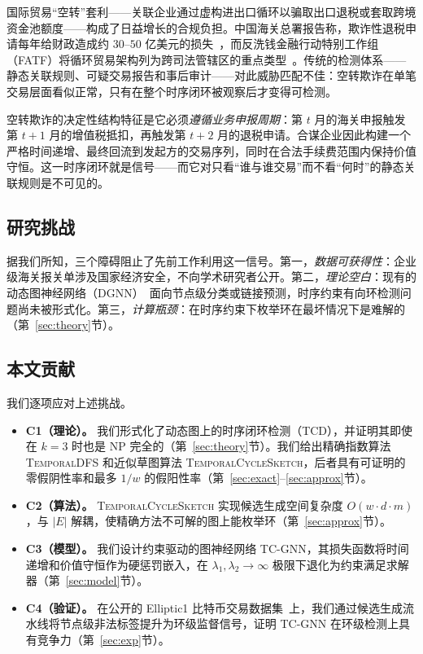 \documentclass[journal,onecolumn]{IEEEtran}
\begin{document}
国际贸易``空转''套利——关联企业通过虚构进出口循环以骗取出口退税或套取跨境资金池额度——构成了日益增长的合规负担。中国海关总署报告称，欺诈性退税申请每年给财政造成约 $30$--$50$ 亿美元的损失~\cite{gaCustoms2023}，而反洗钱金融行动特别工作组（FATF）将循环贸易架构列为跨司法管辖区的重点类型~\cite{fatfTypologies2022}。传统的检测体系——静态关联规则、可疑交易报告和事后审计——对此威胁匹配不佳：空转欺诈在单笔交易层面看似正常，只有在整个时序闭环被观察后才变得可检测。

空转欺诈的决定性结构特征是它必须\emph{遵循业务申报周期}：第 $t$ 月的海关申报触发第 $t+1$ 月的增值税抵扣，再触发第 $t+2$ 月的退税申请。合谋企业因此构建一个严格时间递增、最终回流到发起方的交易序列，同时在合法手续费范围内保持价值守恒。这一时序闭环就是信号——而它对只看``谁与谁交易''而不看``何时''的静态关联规则是不可见的。

\subsection{研究挑战}
\label{sec:intro-challenges}

据我们所知，三个障碍阻止了先前工作利用这一信号。第一，\emph{数据可获得性}：企业级海关报关单涉及国家经济安全，不向学术研究者公开。第二，\emph{理论空白}：现有的动态图神经网络（DGNN）~\cite{tgn2020,dcrnn2018,evolvegcn2020}面向节点级分类或链接预测，时序约束有向环检测问题尚未被形式化。第三，\emph{计算瓶颈}：在时序约束下枚举环在最坏情况下是难解的（第~\ref{sec:theory}节）。

\subsection{本文贡献}
\label{sec:intro-contrib}

我们逐项应对上述挑战。
\begin{itemize}
\item \textbf{C1（理论）。} 我们形式化了动态图上的时序闭环检测（TCD），并证明其即使在 $k=3$ 时也是 NP 完全的（第~\ref{sec:theory}节）。我们给出精确指数算法 \textsc{TemporalDFS} 和近似草图算法 \textsc{TemporalCycleSketch}，后者具有可证明的零假阴性率和最多 $1/w$ 的假阳性率（第~\ref{sec:exact}--\ref{sec:approx}节）。
\item \textbf{C2（算法）。} \textsc{TemporalCycleSketch} 实现候选生成空间复杂度 $O(w \cdot d \cdot m)$，与 $|E|$ 解耦，使精确方法不可解的图上能枚举环（第~\ref{sec:approx}节）。
\item \textbf{C3（模型）。} 我们设计约束驱动的图神经网络 \textsc{TC-GNN}，其损失函数将时间递增和价值守恒作为硬惩罚嵌入，在 $\lambda_1, \lambda_2 \to \infty$ 极限下退化为约束满足求解器（第~\ref{sec:model}节）。
\item \textbf{C4（验证）。} 在公开的 Elliptic1 比特币交易数据集~\cite{ellipticData2019}上，我们通过候选生成流水线将节点级非法标签提升为环级监督信号，证明 TC-GNN 在环级检测上具有竞争力（第~\ref{sec:exp}节）。
\end{itemize}
\end{document}
